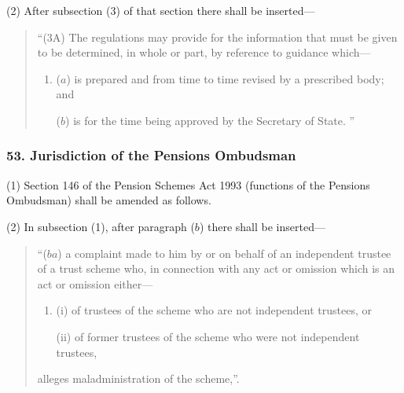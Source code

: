 \documentclass[12pt,a4paper]{article}
\begin{document}
(2) After subsection (3)  of that section there shall be inserted—
\begin{quotation}
“(3A) The regulations may provide for the information that must be given to be determined, in whole or part, by reference to guidance which—
\begin{enumerate}\item[]
($a$) is prepared and from time to time revised by a prescribed body; and

($b$) is for the time being approved by the Secretary of State.%
”
\end{enumerate}
%
%
\end{quotation}


\subsubsection{53. Jurisdiction of the Pensions Ombudsman}

(1) Section 146 of the Pension Schemes Act 1993 (functions of the Pensions Ombudsman) shall be amended as follows.

(2) In subsection (1), after paragraph ($b$)  there shall be inserted—
\begin{quotation}
“($ba$) a complaint made to him by or on behalf of an independent trustee of a trust scheme who, in connection with any act or omission which is an act or omission either—
\begin{enumerate}\item[]
(i) of trustees of the scheme who are not independent trustees, or

(ii) of former trustees of the scheme who were not independent trustees,
\end{enumerate}
alleges maladministration of the scheme,”.
\end{quotation}
\end{document}
